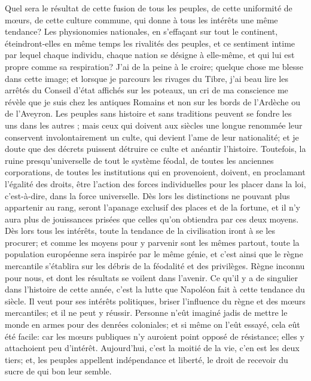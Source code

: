 Quel sera le résultat de cette fusion de tous les peuples, de cette uniformité de mœurs, de cette culture commune, qui donne à tous les intérêts une même tendance? Les physionomies nationales, en s'effaçant sur tout le continent, éteindront-elles en même temps les rivalités des peuples, et ce sentiment intime par lequel chaque individu, chaque nation se désigne à elle-même, et qui lui est propre comme sa respiration? J'ai de la peine à le croire; quelque chose me blesse dans cette image; et lorsque je parcours les rivages du Tibre, j'ai beau lire les arrêtés du Conseil d'état affichés sur les poteaux, un cri de ma conscience me révèle que je suis chez les antiques Romains et non sur les\setcounter{page}{365} bords de l'Ardèche ou de l'Aveyron. Les peuples sans histoire et sans traditions peuvent se fondre les uns dans les autres ; mais ceux qui doivent aux siècles une longue renommée leur conservent involontairement un culte, qui devient l'ame de leur nationalité; et je doute que des décrets puissent détruire ce culte et anéantir l'histoire. Toutefois, la ruine presqu'universelle de tout le système féodal, de toutes les anciennes corporations, de toutes les institutions qui en provenoient, doivent, en proclamant l'égalité des droits, être l'action des forces individuelles pour les placer dans la loi, c'est-à-dire, dans la force universelle. Dès lors les distinctions ne pouvant plus appartenir au rang, seront l'apanage exclusif des places et de la fortune, et il n'y aura plus de jouissances prisées que celles qu'on obtiendra par ces deux moyens. Dès lors tous les intérêts, toute la tendance de la civilisation iront à se les procurer; et comme les moyens pour y parvenir sont les mêmes partout, toute la population européenne sera inspirée par le même génie, et c'est ainsi que le règne mercantile s'établira sur les débris de la féodalité et des privilèges. Règne inconnu pour nous, et dont les résultats se voilent dans l'avenir. Ce qu'il y a de singulier dans l'histoire\setcounter{page}{366} de cette année, c'est la lutte que Napoléon fait à cette tendance du siècle. Il veut pour ses intérêts politiques, briser l'influence du règne et des mœurs mercantiles; et il ne peut y réussir. Personne n'eût imaginé jadis de mettre le monde en armes pour des denrées coloniales; et si même on l'eût essayé, cela eût été facile: car les mœurs publiques n'y auroient point opposé de résistance; elles y attachoient peu d'intérêt. Aujourd'hui, c'est la moitié de la vie, c'en est les deux tiers; et, les peuples appellent indépendance et liberté, le droit de recevoir du sucre de qui bon leur semble.
